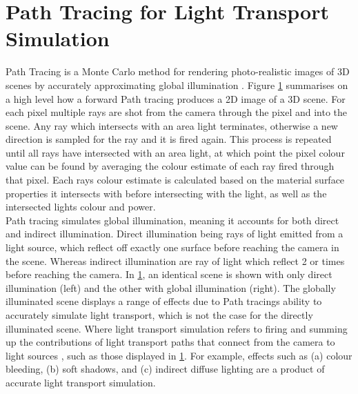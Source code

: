 \documentclass[ %
                    author={Callum Pearce},
                supervisor={Dr. Neill Campbell},
                    degree={MEng},
                     title={How effective are Temporal difference learning methods for reducing the number of zero contribution light paths while still accurately approximating Global Illumination in Path tracing?},
                  subtitle={},
                      type={research},
                      year={2019} ]{dissertation}
\begin{document}
\section{Path Tracing for Light Transport Simulation}
Path Tracing is a Monte Carlo method for rendering photo-realistic images of 3D 
scenes by accurately approximating global illumination \cite{christensen2016path}.
Figure \ref{} summarises on a high level how a forward Path tracing produces a 
2D image of a 3D scene. For each pixel multiple rays are shot from the camera through the 
pixel and into the scene. Any ray which intersects with an area light terminates, 
otherwise a new direction is sampled for the ray and it is fired again. This process 
is repeated until all rays have intersected with an area light, at which point the pixel 
colour value can  be found by averaging the colour estimate of each ray fired 
through that pixel. Each rays colour estimate is calculated based on the material 
surface properties it intersects with before intersecting with the light, as well as the
intersected lights colour and power.\\


Path tracing simulates global illumination, meaning it accounts for both direct and 
indirect illumination. Direct illumination being rays of light emitted from a light 
source, which reflect off exactly one surface before reaching the camera in the 
scene. Whereas indirect illumination are ray of light which reflect 2 or times before
reaching the camera. In \ref{}, an identical scene is shown with only direct illumination
(left) and the other with global illumination (right). The globally illuminated scene displays
a range of effects due to Path tracings ability to accurately simulate light transport, 
which is not the case for the directly illuminated scene. Where light transport simulation
refers to firing and summing up the contributions of light transport paths that connect from the
camera to light sources \cite{keller2016path}, such as those displayed in \ref{}. For 
example, effects such as (a) colour bleeding, (b) soft shadows, and (c) indirect diffuse lighting
are a product of accurate light transport simulation. \\

\end{document}
